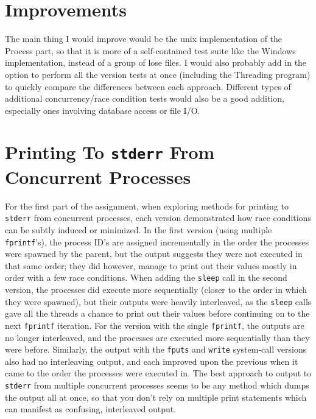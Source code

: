 \documentclass[12pt]{article}
\begin{document}
\section*{Improvements}
The main thing I would improve would be the unix implementation of the Process part, so that it is more of a self-contained test suite like the Windows 
implementation, instead of a group of lose files. I would also probably add in the option to perform all the version tests at once (including the Threading
program) to quickly compare the differences between each approach. Different types of additional concurrency/race condition tests would also be a good addition, 
especially ones involving database access or file I/O.


\section*{Printing To \texttt{stderr} From Concurrent Processes}
For the first part of the assignment, when exploring methods for printing to \texttt{stderr} from concurrent processes, each version demonstrated how race conditions
can be subtly induced or minimized. In the first version (using multiple \texttt{fprintf}'s), the process ID's are assigned incrementally in the order the processes 
were spawned by the parent, but the output suggests they were not executed in that same order; they did however, manage to print out their values mostly in order with
a few race conditions. When adding the \texttt{sleep} call in the second version, the processes did execute more sequentially (closer to the order in which they were spawned),
but their outputs were heavily interleaved, as the \texttt{sleep} calls gave all the threads a chance to print out their values before continuing on to the next \texttt{fprintf}
iteration. For the version with the single \texttt{fprintf}, the outputs are no longer interleaved, and the processes are executed more sequentially than they were before. Similarly,
the output with the \texttt{fputs} and \texttt{write} system-call versions also had no interleaving output, and each improved upon the previous when it came to the order the
processes were executed in.  The best approach to output to \texttt{stderr} from multiple concurrent processes seems to be any method which dumps the output all at once, so that you 
don't rely on multiple print statements which can manifest as confusing, interleaved output.

\newpage
\end{document}
